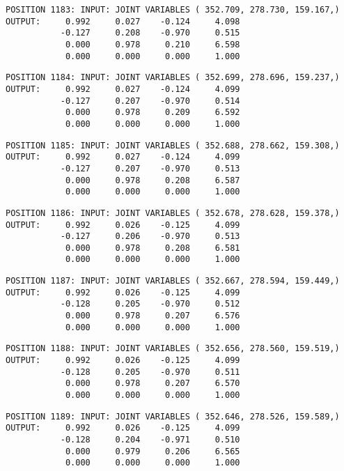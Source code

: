 \begin{verbatim}
POSITION 1183: INPUT: JOINT VARIABLES ( 352.709, 278.730, 159.167,)
OUTPUT:     0.992     0.027    -0.124     4.098
           -0.127     0.208    -0.970     0.515
            0.000     0.978     0.210     6.598
            0.000     0.000     0.000     1.000
\end{verbatim} \pagebreak[1]\begin{verbatim}
POSITION 1184: INPUT: JOINT VARIABLES ( 352.699, 278.696, 159.237,)
OUTPUT:     0.992     0.027    -0.124     4.099
           -0.127     0.207    -0.970     0.514
            0.000     0.978     0.209     6.592
            0.000     0.000     0.000     1.000
\end{verbatim} \pagebreak[1]\begin{verbatim}
POSITION 1185: INPUT: JOINT VARIABLES ( 352.688, 278.662, 159.308,)
OUTPUT:     0.992     0.027    -0.124     4.099
           -0.127     0.207    -0.970     0.513
            0.000     0.978     0.208     6.587
            0.000     0.000     0.000     1.000
\end{verbatim} \pagebreak[1]\begin{verbatim}
POSITION 1186: INPUT: JOINT VARIABLES ( 352.678, 278.628, 159.378,)
OUTPUT:     0.992     0.026    -0.125     4.099
           -0.127     0.206    -0.970     0.513
            0.000     0.978     0.208     6.581
            0.000     0.000     0.000     1.000
\end{verbatim} \pagebreak[1]\begin{verbatim}
POSITION 1187: INPUT: JOINT VARIABLES ( 352.667, 278.594, 159.449,)
OUTPUT:     0.992     0.026    -0.125     4.099
           -0.128     0.205    -0.970     0.512
            0.000     0.978     0.207     6.576
            0.000     0.000     0.000     1.000
\end{verbatim} \pagebreak[1]\begin{verbatim}
POSITION 1188: INPUT: JOINT VARIABLES ( 352.656, 278.560, 159.519,)
OUTPUT:     0.992     0.026    -0.125     4.099
           -0.128     0.205    -0.970     0.511
            0.000     0.978     0.207     6.570
            0.000     0.000     0.000     1.000
\end{verbatim} \pagebreak[1]\begin{verbatim}
POSITION 1189: INPUT: JOINT VARIABLES ( 352.646, 278.526, 159.589,)
OUTPUT:     0.992     0.026    -0.125     4.099
           -0.128     0.204    -0.971     0.510
            0.000     0.979     0.206     6.565
            0.000     0.000     0.000     1.000
\end{verbatim} \pagebreak[1]\begin{verbatim}

\end{verbatim}
